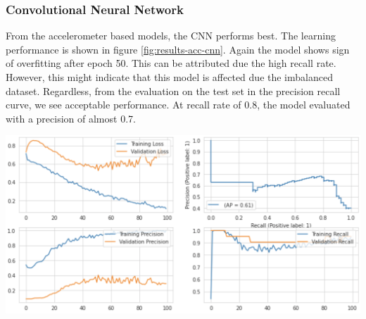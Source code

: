 \begin{minipage}{\textwidth}
\subsubsection{Convolutional Neural Network}

From the accelerometer based models, the CNN performs best. The learning performance is shown in figure \ref{fig:results-acc-cnn}. Again the model shows sign of overfitting after epoch 50. This can be attributed due the high recall rate. However, this might indicate that this model is affected due the imbalanced dataset. Regardless, from the evaluation on the test set in the precision recall curve, we see acceptable performance. At recall rate of 0.8, the model evaluated with a precision of almost 0.7. 
\baselineskip

\begin{center}
\includegraphics[width=.75\textwidth,keepaspectratio]{images/6_results/results-acc-cnn.png}
\end{center}
\captionsetup{width=.90\textwidth}
\label{fig:results-acc-cnn}
\baselineskip
\end{minipage}


